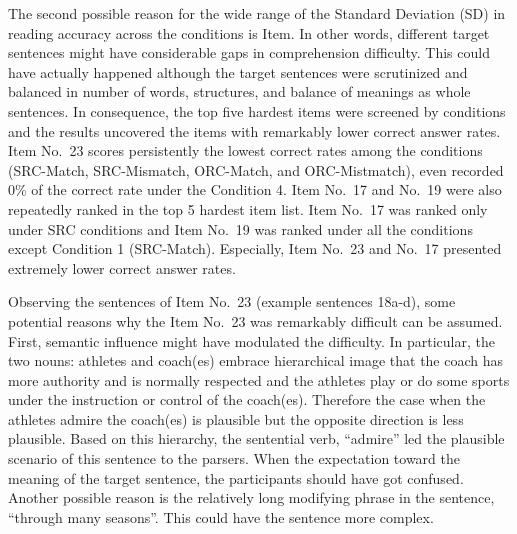 \documentclass[
]{article}
\begin{document}
The second possible reason for the wide range of the Standard Deviation
(SD) in reading accuracy across the conditions is Item. In other words,
different target sentences might have considerable gaps in comprehension
difficulty. This could have actually happened although the target
sentences were scrutinized and balanced in number of words, structures,
and balance of meanings as whole sentences. In consequence, the top five
hardest items were screened by conditions and the results uncovered the
items with remarkably lower correct answer rates. Item No.~23 scores
persistently the lowest correct rates among the conditions (SRC-Match,
SRC-Mismatch, ORC-Match, and ORC-Mistmatch), even recorded 0\% of the
correct rate under the Condition 4. Item No.~17 and No.~19 were also
repeatedly ranked in the top 5 hardest item list. Item No.~17 was ranked
only under SRC conditions and Item No.~19 was ranked under all the
conditions except Condition 1 (SRC-Match). Especially, Item No.~23 and
No.~17 presented extremely lower correct answer rates.

Observing the sentences of Item No.~23 (example sentences 18a-d), some
potential reasons why the Item No.~23 was remarkably difficult can be
assumed. First, semantic influence might have modulated the difficulty.
In particular, the two nouns: athletes and coach(es) embrace
hierarchical image that the coach has more authority and is normally
respected and the athletes play or do some sports under the instruction
or control of the coach(es). Therefore the case when the athletes admire
the coach(es) is plausible but the opposite direction is less plausible.
Based on this hierarchy, the sentential verb, ``admire'' led the
plausible scenario of this sentence to the parsers. When the expectation
toward the meaning of the target sentence, the participants should have
got confused. Another possible reason is the relatively long modifying
phrase in the sentence, ``through many seasons''. This could have the
sentence more complex.

\vspace{1em}
\end{document}

